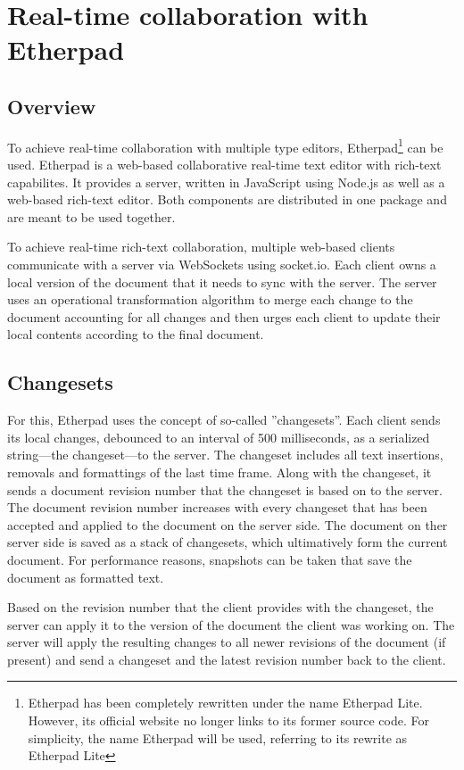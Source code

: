 \section{Real-time collaboration with Etherpad} 

\subsection{Overview}

To achieve real-time collaboration with multiple type editors, Etherpad\footnote{Etherpad has been completely rewritten under the name Etherpad Lite. However, its official website no longer links to its former source code. For simplicity, the name Etherpad will be used, referring to its rewrite as Etherpad Lite} can be used. Etherpad is a web-based collaborative real-time text editor with rich-text capabilites. It provides a server, written in JavaScript using Node.js as well as a web-based rich-text editor. Both components are distributed in one package and are meant to be used together.

To achieve real-time rich-text collaboration, multiple web-based clients communicate with a server via WebSockets using socket.io. Each client owns a local version of the document that it needs to sync with the server. The server uses an operational transformation algorithm to merge each change to the document accounting for all changes and then urges each client to update their local contents according to the final document.

\subsection{Changesets}

For this, Etherpad uses the concept of so-called ''changesets''. Each client sends its local changes, debounced to an interval of 500 milliseconds, as a serialized string---the changeset---to the server. The changeset includes all text insertions, removals and formattings of the last time frame. Along with the changeset, it sends a document revision number that the changeset is based on to the server. The document revision number increases with every changeset that has been accepted and applied to the document on the server side. The document on ther server side is saved as a stack of changesets, which ultimatively form the current document. For performance reasons, snapshots can be taken that save the document as formatted text. 

Based on the revision number that the client provides with the changeset, the server can apply it to the version of the document the client was working on. The server will apply the resulting changes to all newer revisions of the document (if present) and send a changeset and the latest revision number back to the client.

